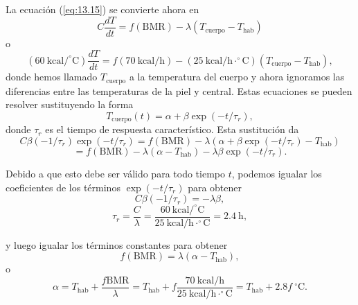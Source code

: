 \documentclass[12pt]{book}
\begin{document}
La ecuación (\ref{eq:13.15}) se convierte ahora en
\begin{equation}
  C \frac{dT}{dt} = f(\text{BMR}) - \lambda (T_{\text{cuerpo}} - T_{\text{hab}}) \label{eq:13.16}
\end{equation}
o
\begin{equation}
  (60\ \text{kcal}/^\circ\text{C}) \frac{dT}{dt} = f(70\ \text{kcal/h}) - (25\ \text{kcal/h}\cdot^\circ\text{C})(T_{\text{cuerpo}} - T_{\text{hab}}), \label{eq:13.17}
\end{equation}
donde hemos llamado $T_{\text{cuerpo}}$ a la temperatura del cuerpo y ahora ignoramos las diferencias entre las temperaturas de la piel y central. Estas ecuaciones se pueden resolver sustituyendo la forma
\begin{equation}
  T_{\text{cuerpo}}(t) = \alpha + \beta \exp(-t/\tau_r), \label{eq:13.18}
\end{equation}
donde $\tau_r$ es el tiempo de respuesta característico. Esta sustitución da
\begin{equation}
  C\beta(-1/\tau_r) \exp(-t/\tau_r) = f(\text{BMR}) - \lambda(\alpha + \beta \exp(-t/\tau_r) - T_{\text{hab}}) \label{eq:13.19}
\end{equation}
\begin{equation}
  = f(\text{BMR}) - \lambda(\alpha - T_{\text{hab}}) - \lambda\beta \exp(-t/\tau_r). \label{eq:13.20}
\end{equation}

Debido a que esto debe ser válido para todo tiempo $t$, podemos igualar los coeficientes de los términos $\exp(-t/\tau_r)$ para obtener
\begin{equation}
  C\beta(-1/\tau_r) = -\lambda\beta, \label{eq:13.21}
\end{equation}
\begin{equation}
  \tau_r = \frac{C}{\lambda} = \frac{60\ \text{kcal}/^\circ\text{C}}{25\ \text{kcal/h}\cdot^\circ\text{C}} = 2.4\ \text{h}, \label{eq:13.22}
\end{equation}


y luego igualar los términos constantes para obtener
\begin{equation}
  f (\text{BMR}) = \lambda(\alpha - T_{\text{hab}}), \label{eq:13.23}
\end{equation}
o
\begin{equation}
  \alpha = T_{\text{hab}} + \frac{f \text{BMR}}{\lambda} = T_{\text{hab}} + f \frac{70\ \text{kcal/h}}{25\ \text{kcal/h}\cdot^\circ\text{C}} = T_{\text{hab}} + 2.8 f\ ^\circ\text{C}. \label{eq:13.24}
\end{equation}
\end{document}

